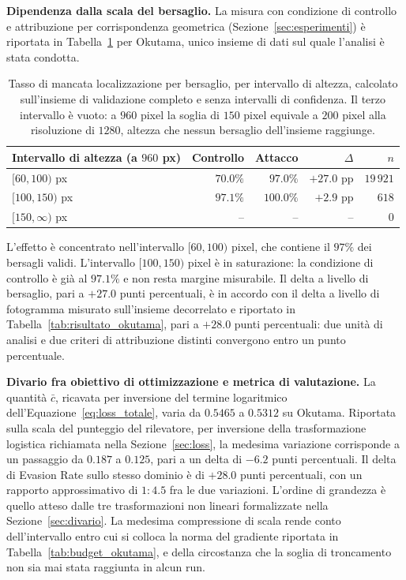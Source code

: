 \ifstampa\documentclass[a4paper,12pt,twoside,openright]{report}\else\documentclass[a4paper,12pt]{report}\fi
\newif\ifrevisione \revisionefalse
\DeclareRobustCommand{\rev}[1]{\ifrevisione{\color{blue!65!black}#1}\else#1\fi}
\begin{document}
\textbf{Dipendenza dalla scala del bersaglio.}
\label{sec:risultato_stratificazione}
La misura con condizione di controllo e attribuzione per corrispondenza geometrica (Sezione~\ref{sec:esperimenti}) è riportata in Tabella~\ref{tab:stratificazione} per Okutama, unico insieme di dati sul quale l'analisi è stata condotta.

\begin{table}[t]
\centering
\begin{tabular}{lrrrr}
\toprule
Intervallo di altezza (a $960$ px) & Controllo & Attacco & $\Delta$ & $n$ \\
\midrule
$[60, 100)$ px & $70.0\%$ & $97.0\%$ & $+27.0$ pp & $19\,921$ \\
$[100, 150)$ px & $97.1\%$ & $100.0\%$ & $+2.9$ pp & $618$ \\
$[150, \infty)$ px & -- & -- & -- & $0$ \\
\bottomrule
\end{tabular}
\caption{Tasso di mancata localizzazione per bersaglio, per intervallo di altezza\rev{, calcolato sull'insieme di validazione completo e senza intervalli di confidenza}. Il terzo intervallo è vuoto: a $960$ pixel la soglia di $150$ pixel equivale a $200$ pixel alla risoluzione di $1280$\rev{, altezza che nessun bersaglio dell'insieme raggiunge}.}
\label{tab:stratificazione}
\end{table}

L'effetto è concentrato nell'intervallo $[60, 100)$ pixel, che contiene il $97\%$ dei bersagli validi. L'intervallo $[100, 150)$ pixel è in saturazione: la condizione di controllo è già al $97.1\%$ e non resta margine misurabile. Il delta a livello di bersaglio, pari a $+27.0$ punti percentuali, è in accordo con il delta a livello di fotogramma \rev{misurato sull'insieme decorrelato} e riportato in Tabella~\ref{tab:risultato_okutama}, pari a $+28.0$ punti percentuali: due unità di analisi e due criteri di attribuzione distinti convergono entro un punto percentuale.

\textbf{Divario fra obiettivo di ottimizzazione e metrica di valutazione.}
\label{sec:risultato_divario}
La quantità $\bar{c}$, ricavata per inversione \rev{del termine logaritmico} dell'Equazione~\ref{eq:loss_totale}, varia da $0.5465$ a $0.5312$ su Okutama. Riportata sulla scala del punteggio del rilevatore, per inversione della trasformazione logistica richiamata nella Sezione~\ref{sec:loss}, la medesima variazione corrisponde a un passaggio da $0.187$ a $0.125$, pari a un delta di $-6.2$ punti percentuali. Il delta di Evasion Rate sullo stesso dominio è di $+28.0$ punti percentuali, con un rapporto approssimativo di $1{:}4.5$ fra le due variazioni. L'ordine di grandezza è quello atteso dalle tre trasformazioni non lineari formalizzate nella Sezione~\ref{sec:divario}. La medesima compressione di scala rende conto dell'intervallo entro cui si colloca la norma del gradiente riportata in Tabella~\ref{tab:budget_okutama}, e della circostanza che la soglia di troncamento non sia mai stata raggiunta in alcun run.
\end{document}
